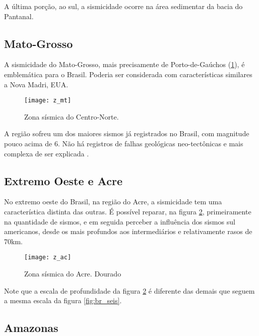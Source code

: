 A última porção, ao sul, a sismicidade ocorre na área sedimentar da bacia do Pantanal.

\subsection{Mato-Grosso}
\label{sec:z_mt}

A sismicidade do Mato-Grosso, mais precisamente de Porto-de-Gaúchos (\ref{fig:z_mt}), é emblemática para o Brasil.
Poderia ser considerada com características similares a Nova Madri, EUA.

\begin{figure}[H]
  \centering
  \texttt{[image: z\_mt]} 
  \caption{Zona sísmica do Centro-Norte. \citet{dourado_2014}}
  \label{fig:z_mt} 
\end{figure}

A região sofreu um dos maiores sismos já registrados no Brasil, com magnitude pouco acima de 6.
Não há registros de falhas geológicas neo-tectônicas e mais complexa de ser explicada \citep{barros_2009}.

\subsection{Extremo Oeste e Acre}
\label{sec:z_ac}

No extremo oeste do Brasil, na região do Acre, a sismicidade tem uma característica distinta das outras.
É possível reparar, na figura \ref{fig:z_ac}, primeiramente na quantidade de sismos, e em
seguida perceber a influência dos sismos sul americanos, desde os mais profundos aos intermediários
e relativamente rasos de 70km. 


\begin{figure}[H]
  \centering
  \texttt{[image: z\_ac]} 
  \caption{Zona sísmica do Acre. Dourado}
  \label{fig:z_ac} 
\end{figure}

Note que a escala de profundidade da figura \ref{fig:z_ac} é diferente das demais que seguem a
mesma escala da figura \ref{fig:br_seis}.


\subsection{Amazonas}
\label{sec:z_am}

